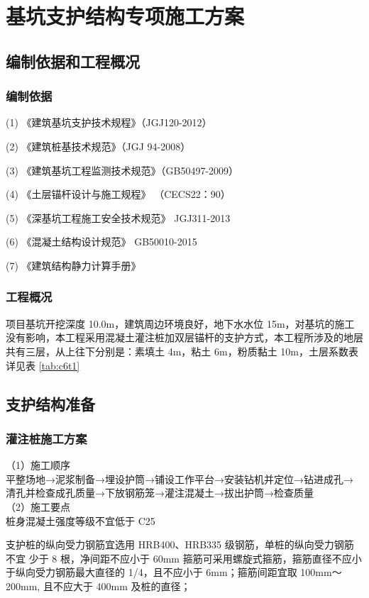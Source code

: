 \section{基坑支护结构专项施工方案}
\subsection{编制依据和工程概况}
\subsubsection{编制依据}

(1) 《建筑基坑支护技术规程》（JGJ120-2012）

(2) 《建筑桩基技术规范》（JGJ 94-2008）

(3) 《建筑基坑工程监测技术规范》（GB50497-2009）

(4) 《土层锚杆设计与施工规程》 （CECS22：90）

(5) 《深基坑工程施工安全技术规范》 JGJ311-2013

(6) 《混凝土结构设计规范》 GB50010-2015

(7) 《建筑结构静力计算手册》

\subsubsection{工程概况}

项目基坑开挖深度 10.0m，建筑周边环境良好，地下水水位 15m，对基坑的施工没有影响，本工程采用混凝土灌注桩加双层锚杆的支护方式，本工程所涉及的地层
共有三层，从上往下分别是：素填土 4m，粘土 6m，粉质黏土 10m，土层系数表详见表 \ref{tab:c6t1} 

\subsection{支护结构准备}
\subsubsection{灌注桩施工方案}

（1）施工顺序\\

平整场地→泥浆制备→埋设护筒→铺设工作平台→安装钻机并定位→钻进成孔→ 清孔并检查成孔质量→下放钢筋笼→灌注混凝土→拔出护筒→检查质量\\

（2）施工要点\\

 桩身混凝土强度等级不宜低于 C25

 支护桩的纵向受力钢筋宜选用 HRB400、HRB335 级钢筋，单桩的纵向受力钢筋不宜
少于 8 根，净间距不应小于 60mm
 箍筋可采用螺旋式箍筋，箍筋直径不应小于纵向受力钢筋最大直径的 1/4，且不应小于
6mm；箍筋间距宜取 100mm～200mm, 且不应大于 400mm 及桩的直径；

